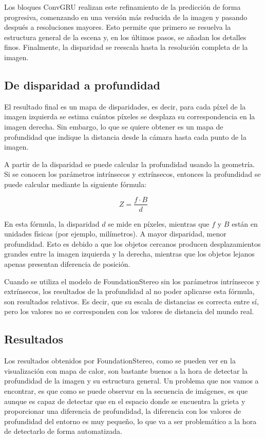 Los bloques ConvGRU realizan este refinamiento de la predicción de forma progresiva, comenzando en una versión más reducida de la imagen y pasando después a resoluciones mayores. Esto permite que primero se resuelva la estructura general de la escena y, en los últimos pasos, se añadan los detalles finos. Finalmente, la disparidad se reescala hasta la resolución completa de la imagen.

\subsection{De disparidad a profundidad}
El resultado final es un mapa de disparidades, es decir, para cada píxel de la imagen izquierda se estima cuántos píxeles se desplaza su correspondencia en la imagen derecha. Sin embargo, lo que se quiere obtener es un mapa de profundidad que indique la distancia desde la cámara hasta cada punto de la imagen.

A partir de la disparidad se puede calcular la profundidad usando la geometría. Si se conocen los parámetros intrínsecos y extrínsecos, entonces la profundidad se puede calcular mediante la siguiente fórmula:

\[
Z = \frac{f \cdot B}{d}
\]

En esta fórmula, la disparidad $d$ se mide en píxeles, mientras que $f$ y $B$ están en unidades físicas (por ejemplo, milímetros). A mayor disparidad, menor profundidad. Esto es debido a que los objetos cercanos producen desplazamientos grandes entre la imagen izquierda y la derecha, mientras que los objetos lejanos apenas presentan diferencia de posición.

Cuando se utiliza el modelo de FoundationStereo sin los parámetros intrínsecos y extrínsecos, los resultados de la profundidad al no poder aplicarse esta fórmula, son resultados relativos. Es decir, que su escala de distancias es correcta entre sí, pero los valores no se corresponden con los valores de distancia del mundo real.


\subsection{Resultados}
Los resultados obtenidos por FoundationStereo, como se pueden ver en la visualización con mapa de calor, son bastante buenos a la hora de detectar la profundidad de la imagen y su estructura general. Un problema que nos vamos a encontrar, es que como se puede observar en la secuencia de imágenes, es que aunque es capaz de detectar que en el espacio donde se encuentra la grieta y proporcionar una diferencia de profundidad, la diferencia con los valores de profundidad del entorno es muy pequeño, lo que va a ser problemático a la hora de detectarlo de forma automatizada.


